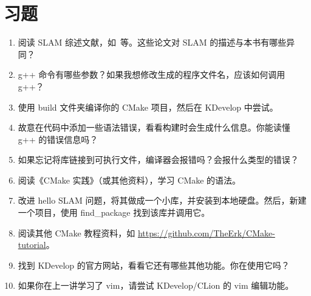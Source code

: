 \section*{习题}
\begin{enumerate}
    \item[\optional] 阅读 SLAM 综述文献，如~\cite{Cadena2016, Fuentes-Pacheco2015, Boal2014, Chen2012, Chen2007}等。这些论文对 SLAM 的描述与本书有哪些异同？
    \item g++ 命令有哪些参数？如果我想修改生成的程序文件名，应该如何调用 g++？
    \item 使用 build 文件夹编译你的 CMake 项目，然后在 KDevelop 中尝试。
    \item 故意在代码中添加一些语法错误，看看构建时会生成什么信息。你能读懂 g++ 的错误信息吗？
    \item 如果忘记将库链接到可执行文件，编译器会报错吗？会报什么类型的错误？
    \item[\optional] 阅读《CMake 实践》（或其他资料），学习 CMake 的语法。
    \item[\optional] 改进 hello SLAM 问题，将其做成一个小库，并安装到本地硬盘。然后，新建一个项目，使用 find\_package 找到该库并调用它。
    \item[\optional] 阅读其他 CMake 教程资料，如 \url{https://github.com/TheErk/CMake-tutorial}。
    \item 找到 KDevelop 的官方网站，看看它还有哪些其他功能。你在使用它吗？
    \item 如果你在上一讲学习了 vim，请尝试 KDevelop/CLion 的 vim 编辑功能。
\end{enumerate}